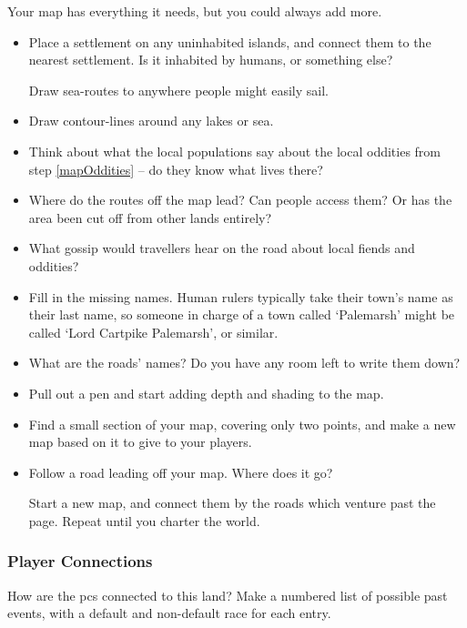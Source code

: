\begin{multicols}{2}
\begin{enumerate}
\end{enumerate}


Your map has everything it needs, but you could always add more.

\begin{itemize}
  \item
  Place a settlement on any uninhabited islands, and connect them to the nearest settlement.
  Is it inhabited by humans, or something else?

  Draw sea-routes to anywhere people might easily sail.
  \item
  Draw contour-lines around any lakes or sea.
  \item
  Think about what the local populations say about the local oddities from step \ref{mapOddities} -- do they know what lives there?
  \item
  Where do the routes off the map lead?
  Can people access them?
  Or has the area been cut off from other lands entirely?
  \item
  What gossip would travellers hear on the road about local fiends and oddities?
  \item
  Fill in the missing names.
  Human rulers typically take their town's name as their last name, so someone in charge of a town called `Palemarsh' might be called  `Lord Cartpike Palemarsh', or similar.
  \item
  What are the roads' names?
  Do you have any room left to write them down?
  \item
  Pull out a pen and start adding depth and shading to the map.
  \item
  Find a small section of your map, covering only two points, and make a new map based on it to give to your players.
  \item
  Follow a road leading off your map.
  Where does it go?

  Start a new map, and connect them by the roads which venture past the page.
  Repeat until you charter the world.
\end{itemize}

\bigLine

\subsubsection{Player Connections}

How are the \glspl{pc} connected to this land?
Make a numbered list of possible past events, with a default and non-default race for each entry.


\end{multicols}
